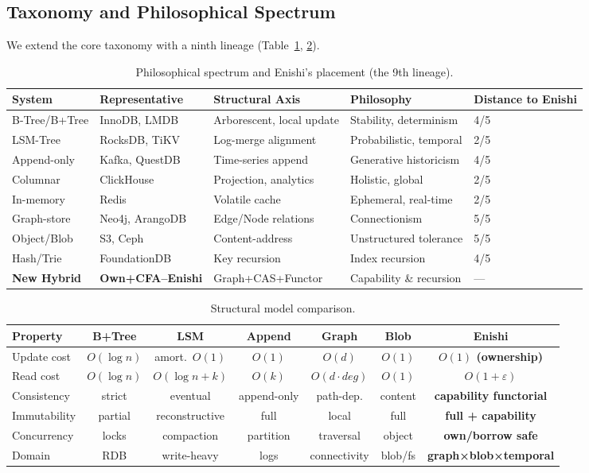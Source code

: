\documentclass[10pt]{article}
\begin{document}
\subsection{Taxonomy and Philosophical Spectrum}
We extend the core taxonomy with a ninth lineage (Table~\ref{tab:spectrum}, \ref{tab:model}).
\begin{table}[h]
\centering
\small
\begin{tabularx}{\linewidth}{l l l l l}
\toprule
System & Representative & Structural Axis & Philosophy & Distance to Enishi \\
\midrule
B-Tree/B+Tree & InnoDB, LMDB & Arborescent, local update & Stability, determinism & 4/5 \\
LSM-Tree & RocksDB, TiKV & Log-merge alignment & Probabilistic, temporal & 2/5 \\
Append-only & Kafka, QuestDB & Time-series append & Generative historicism & 4/5 \\
Columnar & ClickHouse & Projection, analytics & Holistic, global & 2/5 \\
In-memory & Redis & Volatile cache & Ephemeral, real-time & 2/5 \\
Graph-store & Neo4j, ArangoDB & Edge/Node relations & Connectionism & 5/5 \\
Object/Blob & S3, Ceph & Content-address & Unstructured tolerance & 5/5 \\
Hash/Trie & FoundationDB & Key recursion & Index recursion & 4/5 \\
\textbf{New Hybrid} & \textbf{Own+CFA--Enishi} & Graph+CAS+Functor & Capability \& recursion & --- \\
\bottomrule
\end{tabularx}
\caption{Philosophical spectrum and Enishi's placement (the 9th lineage).}
\label{tab:spectrum}
\end{table}

\begin{table}[h]
\centering
\small
\begin{tabularx}{\linewidth}{l c c c c c c}
\toprule
Property & B+Tree & LSM & Append & Graph & Blob & \textbf{Enishi} \\
\midrule
Update cost & $O(\log n)$ & amort.\ $O(1)$ & $O(1)$ & $O(d)$ & $O(1)$ & \textbf{$O(1)$ (ownership)} \\
Read cost & $O(\log n)$ & $O(\log n{+}k)$ & $O(k)$ & $O(d\cdot deg)$ & $O(1)$ & \textbf{$O(1{+}\varepsilon)$} \\
Consistency & strict & eventual & append-only & path-dep. & content & \textbf{capability functorial} \\
Immutability & partial & reconstructive & full & local & full & \textbf{full + capability} \\
Concurrency & locks & compaction & partition & traversal & object & \textbf{own/borrow safe} \\
Domain & RDB & write-heavy & logs & connectivity & blob/fs & \textbf{graph×blob×temporal} \\
\bottomrule
\end{tabularx}
\caption{Structural model comparison.}
\label{tab:model}
\end{table}
\end{document}
